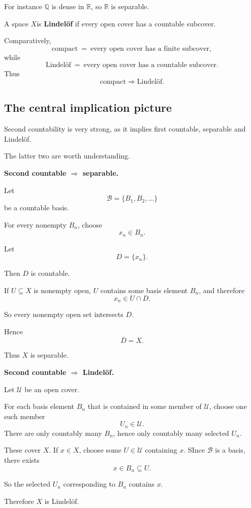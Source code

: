 \documentclass[11pt]{article}
\begin{document}
For instance $\mathbb Q$ is dense in $\mathbb R$, so 
$\mathbb R$ is separable. 

A space $X$is \textbf{Lindel{\"o}f} if every open 
cover has a countable subcover.  

Comparatively, 
\[
    \text{compact} \ = \ \text{every open cover 
    has a finite subcover}, 
\]
while 
\[
    \text{Lindel{\"o}f} \ = \ \text{every open 
    cover has a countable subcover}. 
\]
Thus 
\[
    \text{compact} \Rightarrow \text{Lindel{\"o}f}.
\]

\subsection{The central implication picture}

Second countability is very strong, as it implies 
first countable, separable and Lindel{\"o}f. 

The latter two are worth understanding. 

\textbf{Second countable $\Rightarrow$ separable.}

Let 
\[
    \mathcal B = \{B_1,B_2,\ldots\}
\]
be a countable basis. 

For every nonempty $B_n$, choose 
\[
    x_n \in B_n. 
\]

Let 
\[  
    D = \{x_n\}. 
\]

Then $D$ is countable. 

If $U \subseteq X$ is nonempty open, $U$ contains 
some basis element $B_n$, and therefore 
\[
    x_n \in U \cap D. 
\]

So every nonempty open set intersects $D$. 

Hence 
\[
    \overline D = X. 
\]

Thus $X$ is separable. 

\textbf{Second countable $\Rightarrow$ Lindel{\"o}f.}

Let $\mathcal U$ be an open cover. 

For each basis element $B_n$ that is contained 
in some member of $\mathcal U$, choose one such member 
\[
    U_n \in \mathcal U. 
\]
There are only countably many $B_n$, hence only 
countably many selected $U_n$. 

These cover $X$. If $x \in X$, choose 
some $U \in \mathcal U$ containing $x$. 
SInce $\mathcal B$ is a basis, there 
exists 
\[
    x \in B_n \subseteq U. 
\]

So the selected $U_n$ corresponding to $B_n$ contains 
$x$. 

Therefore $X$ is Lindel{\"o}f. 
\end{document}
